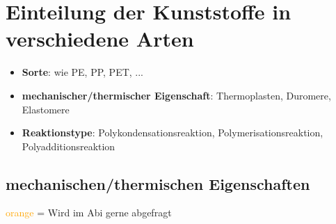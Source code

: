 \section{Einteilung der Kunststoffe in verschiedene Arten}

\begin{itemize}
    \item \textbf{Sorte}: wie PE, PP, PET, ...
    \item \textbf{mechanischer/thermischer Eigenschaft}: Thermoplasten, Duromere, Elastomere
    \item \textbf{Reaktionstype}: Polykondensationsreaktion, Polymerisationsreaktion, Polyadditionsreaktion
\end{itemize}

\subsection{mechanischen/thermischen Eigenschaften}

\vspace{0.3cm}
\textcolor{orange}{orange} = Wird im Abi gerne abgefragt
\vspace{0.3cm}


